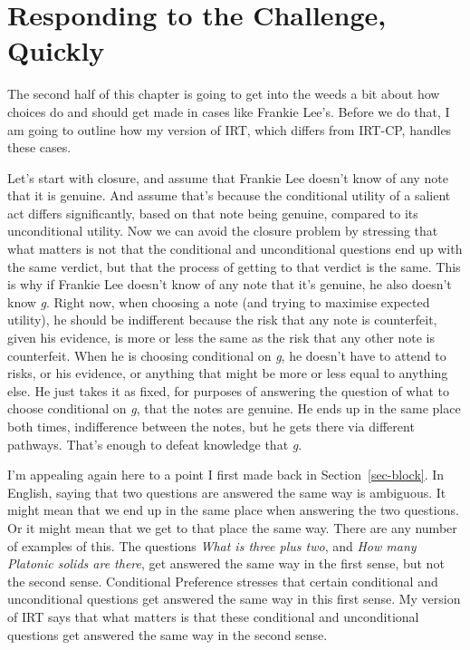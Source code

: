 \documentclass[
  10pt,
  letterpaper,
  twoside]{scrbook}
\begin{document}
\section{Responding to the Challenge, Quickly}\label{sec-tiesresponse}

The second half of this chapter is going to get into the weeds a bit
about how choices do and should get made in cases like Frankie Lee's.
Before we do that, I am going to outline how my version of IRT, which
differs from IRT-CP, handles these cases.

Let's start with closure, and assume that Frankie Lee doesn't know of
any note that it is genuine. And assume that's because the conditional
utility of a salient act differs significantly, based on that note being
genuine, compared to its unconditional utility. Now we can avoid the
closure problem by stressing that what matters is not that the
conditional and unconditional questions end up with the same verdict,
but that the process of getting to that verdict is the same. This is why
if Frankie Lee doesn't know of any note that it's genuine, he also
doesn't know \emph{g}. Right now, when choosing a note (and trying to
maximise expected utility), he should be indifferent because the risk
that any note is counterfeit, given his evidence, is more or less the
same as the risk that any other note is counterfeit. When he is choosing
conditional on \emph{g}, he doesn't have to attend to risks, or his
evidence, or anything that might be more or less equal to anything else.
He just takes it as fixed, for purposes of answering the question of
what to choose conditional on \emph{g}, that the notes are genuine. He
ends up in the same place both times, indifference between the notes,
but he gets there via different pathways. That's enough to defeat
knowledge that \emph{g}.

I'm appealing again here to a point I first made back in
Section~\ref{sec-block}. In English, saying that two questions are
answered the same way is ambiguous. It might mean that we end up in the
same place when answering the two questions. Or it might mean that we
get to that place the same way. There are any number of examples of
this. The questions \emph{What is three plus two}, and \emph{How many
Platonic solids are there}, get answered the same way in the first
sense, but not the second sense. Conditional Preference stresses that
certain conditional and unconditional questions get answered the same
way in this first sense. My version of IRT says that what matters is
that these conditional and unconditional questions get answered the same
way in the second sense.
\end{document}
